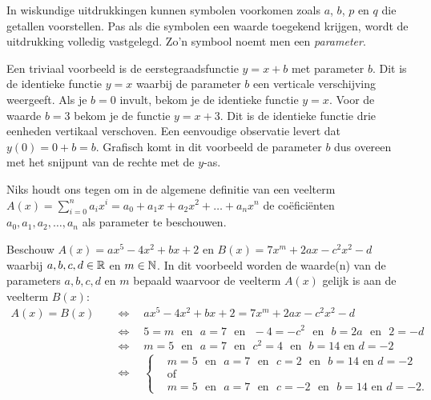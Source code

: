 \documentclass{ximera}
\begin{document}
	\author{Koen de Naeghel - Wiskunde Op Maat}
    \xmsource



In wiskundige uitdrukkingen kunnen symbolen voorkomen zoals \(a\), \(b\), \(p\) en \(q\) die getallen voorstellen. Pas als die symbolen een waarde toegekend krijgen, wordt de uitdrukking volledig vastgelegd. Zo'n symbool noemt men een \textit{ parameter}. 

Een triviaal voorbeeld is de eerstegraadsfunctie \(y = x + b\) met parameter \(b\). Dit is de identieke functie \(y = x\) waarbij de parameter \(b\) een verticale verschijving weergeeft. Als je \(b = 0\) invult, bekom je de identieke functie \(y = x\). Voor de waarde \(b =3\) bekom je de functie \(y = x+3\). Dit is de identieke functie drie eenheden vertikaal verschoven. Een eenvoudige observatie levert dat \(y(0) = 0 + b = b\). Grafisch komt in dit voorbeeld de parameter \(b\) dus overeen met het snijpunt van de rechte met de \(y\)-as. 

Niks houdt ons tegen om in de algemene definitie van een veelterm \(A(x) = \sum_{i=0}^n a_i x^i = a_0 + a_1x + a_2x^2 + \dots + a_n x^n\) de coëficiënten \(a_0, a_1, a_2, \ldots, a_n\)  als parameter te beschouwen.  

\begin{example} 
Beschouw \(A(x) = ax^5 - 4x^2 + bx + 2\) en \(B(x) = 7x^m + 2ax - c^2x^2 - d\) waarbij \(a,b,c,d \in \mathbb{R}\) en \(m \in \mathbb{N}\). In dit voorbeeld worden de waarde(n) van de parameters \(a,b,c,d\) en \(m\) bepaald waarvoor de veelterm \(A(x)\) gelijk is aan de veelterm \(B(x)\): 
\begin{align*}
A(x) = B(x) \quad 
& \Leftrightarrow \quad ax^5 - 4x^2 + bx + 2 = 7x^m + 2ax - c^2x^2 - d \\
& \Leftrightarrow \quad 5 = m \,\,\text{ en }\,\, a = 7 \,\,\text{ en }\,\, -4 = -c^2 \,\,\text{ en }\,\, b = 2a \,\,\text{ en }\,\, 2 = -d \\
& \Leftrightarrow \quad m=5 \,\,\text{ en }\,\, a = 7 \,\,\text{ en }\,\, c^2 = 4 \,\,\text{ en }\,\, b = 14 \text{ en } d = -2 \\
& \Leftrightarrow \quad 
\left\{
\begin{aligned}
& m=5 \,\,\text{ en }\,\, a = 7 \,\,\text{ en }\,\, c = 2 \,\,\text{ en }\,\, b = 14 \text{ en } d = -2 \\
& \text{of} \\
& m=5 \,\,\text{ en }\,\, a = 7 \,\,\text{ en }\,\, c = -2 \,\,\text{ en }\,\, b = 14 \text{ en } d = -2.
\end{aligned}
\right.
\end{align*}
\end{example} 
\end{document}
